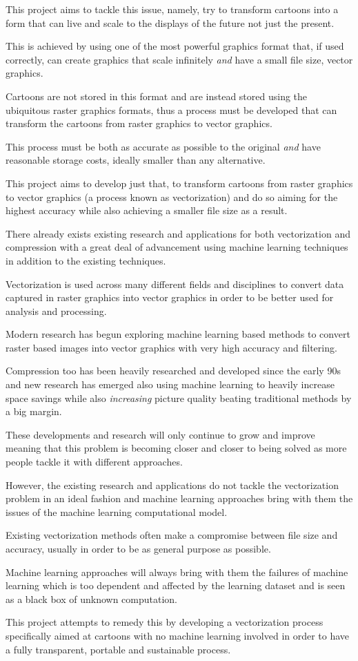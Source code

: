 \documentclass[12pt]{article}
\newcommand{\sentence}{} %
\newcommand{\italic}[1]{\textit{#1}}
\begin{document}
    \bigskip
    This project aims to tackle this issue, namely, try to transform cartoons into a form that can live and scale to
    the displays of the future not just the present.
    \sentence
    This is achieved by using one of the most powerful graphics format that, if used correctly, can create graphics that
    scale infinitely \italic{and} have a small file size, vector graphics.
    \sentence
    Cartoons are not stored in this format and are instead stored using the ubiquitous raster graphics formats, thus
    a process must be developed that can transform the cartoons from raster graphics to vector graphics.
    \sentence
    This process must be both as accurate as possible to the original \italic{and} have reasonable storage costs,
    ideally smaller than any alternative.
    \sentence
    This project aims to develop just that, to transform cartoons from raster graphics to vector graphics (a process
    known as vectorization) and do so aiming for the highest accuracy while also achieving a smaller file size as a
    result.

    \bigskip
    There already exists existing research and applications for both vectorization and compression with a great deal
    of advancement using machine learning techniques in addition to the existing techniques.
    \sentence
    Vectorization is used across many different fields and disciplines to convert data captured in raster graphics
    into vector graphics in order to be better used for analysis and processing.
    \sentence
    Modern research has begun exploring machine learning based methods to convert raster based images into vector
    graphics with very high accuracy and filtering.
    \sentence
    Compression too has been heavily researched and developed since the early 90s and new research has emerged also
    using machine learning to heavily increase space savings while also \italic{increasing} picture quality beating
    traditional methods by a big margin.
    \sentence
    These developments and research will only continue to grow and improve meaning that this problem is becoming
    closer and closer to being solved as more people tackle it with different approaches.

    \bigskip
    However, the existing research and applications do not tackle the vectorization problem in an ideal fashion and
    machine learning approaches bring with them the issues of the machine learning computational model.
    \sentence
    Existing vectorization methods often make a compromise between file size and accuracy, usually in order to be as
    general purpose as possible.
    \sentence
    Machine learning approaches will always bring with them the failures of machine learning which is too dependent
    and affected by the learning dataset and is seen as a black box of unknown computation.
    \sentence
    This project attempts to remedy this by developing a vectorization process specifically aimed at cartoons with no
    machine learning involved in order to have a fully transparent, portable and sustainable process.
\end{document}
